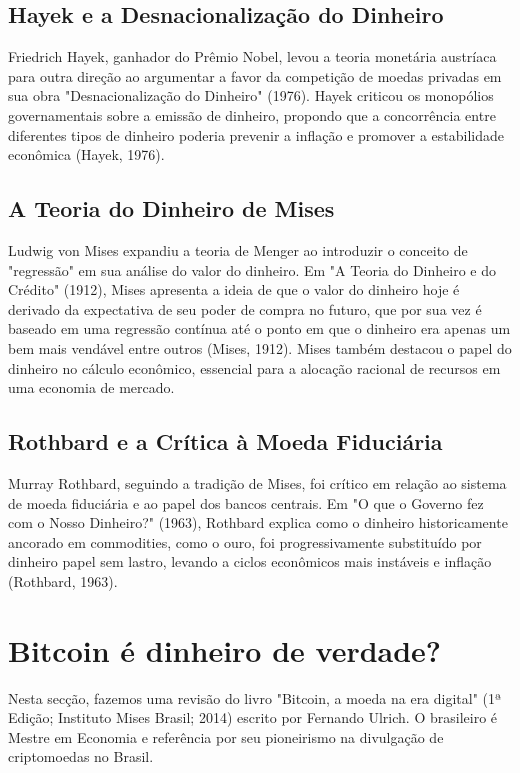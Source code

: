 \subsection{Hayek e a Desnacionalização do Dinheiro}
Friedrich Hayek, ganhador do Prêmio Nobel, levou a teoria monetária austríaca para outra direção ao argumentar a favor da competição de moedas privadas em sua obra "Desnacionalização do Dinheiro" (1976). Hayek criticou os monopólios governamentais sobre a emissão de dinheiro, propondo que a concorrência entre diferentes tipos de dinheiro poderia prevenir a inflação e promover a estabilidade econômica (Hayek, 1976).

\subsection{A Teoria do Dinheiro de Mises}
Ludwig von Mises expandiu a teoria de Menger ao introduzir o conceito de "regressão" em sua análise do valor do dinheiro. Em "A Teoria do Dinheiro e do Crédito" (1912), Mises apresenta a ideia de que o valor do dinheiro hoje é derivado da expectativa de seu poder de compra no futuro, que por sua vez é baseado em uma regressão contínua até o ponto em que o dinheiro era apenas um bem mais vendável entre outros (Mises, 1912). Mises também destacou o papel do dinheiro no cálculo econômico, essencial para a alocação racional de recursos em uma economia de mercado.

\subsection{Rothbard e a Crítica à Moeda Fiduciária}
Murray Rothbard, seguindo a tradição de Mises, foi crítico em relação ao sistema de moeda fiduciária e ao papel dos bancos centrais. Em "O que o Governo fez com o Nosso Dinheiro?" (1963), Rothbard explica como o dinheiro historicamente ancorado em commodities, como o ouro, foi progressivamente substituído por dinheiro papel sem lastro, levando a ciclos econômicos mais instáveis e inflação (Rothbard, 1963).

\section{Bitcoin é dinheiro de verdade?} \label{sec:dinheiro}
Nesta secção, fazemos uma revisão do livro "Bitcoin, a moeda na era digital" (1ª Edição; Instituto Mises Brasil; 2014) escrito por Fernando Ulrich. O brasileiro é Mestre em Economia e referência por seu pioneirismo na divulgação de criptomoedas no Brasil. 

